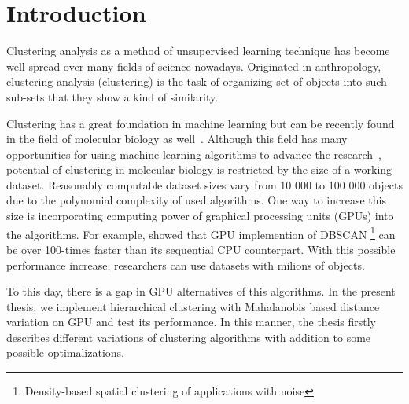 \chapter*{Introduction}


Clustering analysis as a method of unsupervised learning technique has become well spread over many fields of science nowadays. Originated in anthropology, clustering analysis (clustering) is the task of organizing set of objects into such sub-sets that they show a kind of similarity. 

Clustering has a great foundation in machine learning but can be recently found in the field of molecular biology as well~\cite{Nugent2010}. Although this field has many opportunities for using machine learning algorithms to advance the research~\cite{btaa091}, potential of clustering in molecular biology is restricted by the size of a working dataset. Reasonably computable dataset sizes vary from 10 000 to 100 000 objects due to the polynomial complexity of used algorithms. One way to increase this size is incorporating computing power of graphical processing units (GPUs) into the algorithms. For example, \citet{andrade2013g} showed that GPU implemention of DBSCAN \footnote{Density-based spatial clustering of applications with noise} can be over 100-times faster than its sequential CPU counterpart. With this possible performance increase, researchers can use datasets with milions of objects. 

To this day, there is a gap in GPU alternatives of this algorithms. In the present thesis, we implement hierarchical clustering with Mahalanobis based distance variation on GPU and test its performance. In this manner, the thesis firstly describes different variations of clustering algorithms with addition to some possible optimalizations.
